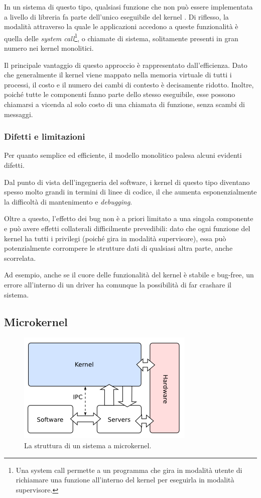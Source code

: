 \documentclass[12pt,a4paper]{report}
\begin{document}
			In un sistema di questo tipo, qualsiasi funzione che non può essere implementata a livello di libreria fa parte
			dell'unico eseguibile del kernel \cite{WIKI_Kernel}. Di riflesso, la modalità attraverso la quale le applicazioni
			accedono a queste funzionalità è quella delle \emph{system call}\footnote{Una system call permette a un programma che
			gira in modalità utente di richiamare una funzione all'interno del kernel per eseguirla in modalità supervisore.}, o chiamate di sistema,
			solitamente presenti in gran numero nei kernel monolitici.
			
			Il principale vantaggio di questo approccio è rappresentato dall'efficienza. Dato che generalmente il kernel viene mappato
			nella memoria virtuale di tutti i processi, il costo e il numero dei cambi di contesto è decisamente ridotto. Inoltre, poiché
			tutte le componenti fanno parte dello stesso eseguibile, esse possono chiamarsi a vicenda al solo costo di una chiamata
			di funzione, senza scambi di messaggi.
			
			\subsubsection{Difetti e limitazioni}
				Per quanto semplice ed efficiente, il modello monolitico palesa alcuni evidenti difetti.
			
				Dal punto di vista dell'ingegneria del software, i kernel di questo tipo diventano spesso molto grandi in termini di
				linee di codice, il che aumenta esponenzialmente la difficoltà di mantenimento e \emph{debugging}.
			
				Oltre a questo, l'effetto dei bug non è a priori limitato a una singola componente e può avere effetti collaterali
				difficilmente prevedibili: dato che ogni funzione del kernel ha tutti i privilegi (poiché gira in modalità supervisore),
				essa può potenzialmente corrompere le strutture dati di qualsiasi altra parte, anche scorrelata.
			
				Ad esempio, anche se il cuore delle funzionalità del kernel è stabile e bug-free, un errore all'interno di un driver
				ha comunque la possibilità di far crashare il sistema.
					
		\subsection{Microkernel}
			\begin{figure}[htbp]
			\centering
			\includegraphics[scale=0.7]{img/microkernel.png}
			\caption{La struttura di un sistema a microkernel. \cite{OSDEV_Microkernel}\label{fig:microkernel}}
			\end{figure}
			
\end{document}
